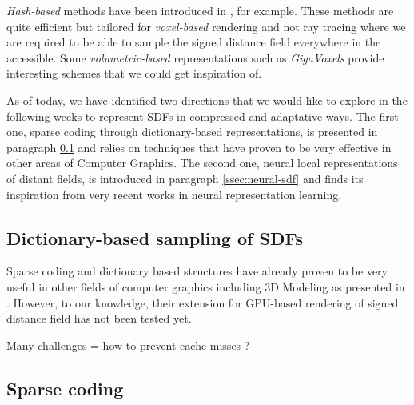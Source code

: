 \documentclass[10pt,a4paper,english, twocolumn]{article}
\begin{document}
\textit{Hash-based} methods have been introduced in \cite{10.1145/2508363.2508374}, for example. These methods are quite efficient but tailored for \textit{voxel-based} rendering and not ray tracing where we are required to be able to sample the signed distance field everywhere in the accessible. Some \textit{volumetric-based} representations such as \textit{GigaVoxels}\cite{crassin:inria-00345899} provide interesting schemes that we could get inspiration of.

As of today, we have identified two directions that we would like to explore in the following weeks to represent SDFs in compressed and adaptative ways. The first one, sparse coding through dictionary-based representations, is presented in paragraph \ref{ssec:dictionary-sdf} and relies on techniques that have proven to be very effective in other areas of Computer Graphics. The second one, neural local representations of distant fields, is introduced in paragraph \ref{ssec:neural-sdf} and finds its inspiration from very recent works in neural representation learning.

\subsection{Dictionary-based sampling of SDFs}
\label{ssec:dictionary-sdf}

Sparse coding and dictionary based structures have already proven to be very useful in other fields of computer graphics including 3D Modeling as presented in \cite{Lescoat:2018:3DDictSTAR}. However, to our knowledge, their extension for GPU-based rendering of signed distance field has not been tested yet. 

Many challenges = how to prevent cache misses ?

\subsection{Sparse coding}



\end{document}

